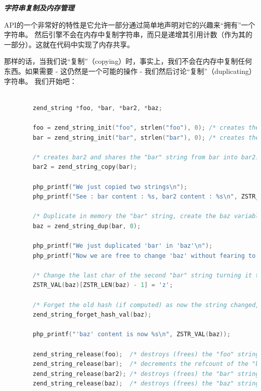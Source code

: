 \textbf{\textit{字符串复制及内存管理}}

 API的一个非常好的特性是它允许一部分通过简单地声明对它的兴趣来“拥有”一个字符串。 然后引擎不会在内存中复制字符串，而只是递增其引用计数（作为其的一部分）。这就在代码中实现了内存共享。

那样的话，当我们说“复制”（copying）时，事实上，我们不会在内存中复制任何东西。如果需要 - 这仍然是一个可能的操作 - 我们然后讨论“复制”（duplicating）字符串。 我们开始吧：

\begin{lstlisting}[language=c]

        zend_string *foo, *bar, *bar2, *baz;

        foo = zend_string_init("foo", strlen("foo"), 0); /* creates the "foo" string in foo */
        bar = zend_string_init("bar", strlen("bar"), 0); /* creates the "bar" string in bar */

        /* creates bar2 and shares the "bar" string from bar into bar2. Also increments the refcount of the "bar" string to 2 */
        bar2 = zend_string_copy(bar);

        php_printf("We just copied two strings\n");
        php_printf("See : bar content : %s, bar2 content : %s\n", ZSTR_VAL(bar), ZSTR_VAL(bar2));

        /* Duplicate in memory the "bar" string, create the baz variable and make it solo owner of the newly created "bar" string */
        baz = zend_string_dup(bar, 0);

        php_printf("We just duplicated 'bar' in 'baz'\n");
        php_printf("Now we are free to change 'baz' without fearing to change 'bar'\n");

        /* Change the last char of the second "bar" string turning it to "baz" */
        ZSTR_VAL(baz)[ZSTR_LEN(baz) - 1] = 'z';

        /* Forget the old hash (if computed) as now the string changed, thus its hash must also change and get recomputed */
        zend_string_forget_hash_val(baz);

        php_printf("'baz' content is now %s\n", ZSTR_VAL(baz));

        zend_string_release(foo);  /* destroys (frees) the "foo" string */
        zend_string_release(bar);  /* decrements the refcount of the "bar" string to one */
        zend_string_release(bar2); /* destroys (frees) the "bar" string both in bar and bar2 vars */
        zend_string_release(baz);  /* destroys (frees) the "baz" string */
        
\end{lstlisting}    

